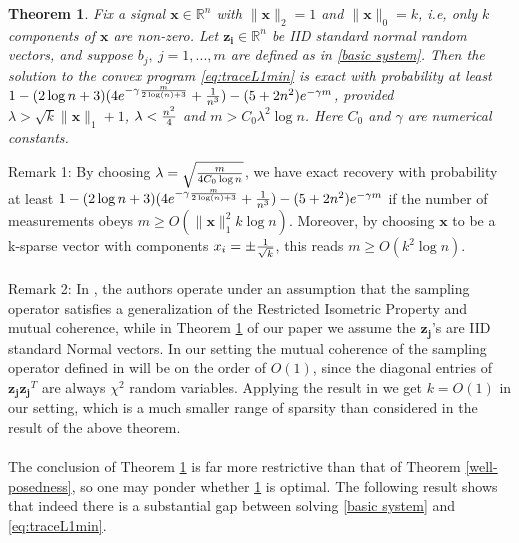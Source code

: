\documentclass[11pt]{article}
\newtheorem{theorem}{Theorem}[section]
\newcommand{\<}{\langle}
\renewcommand{\>}{\rangle}
\newcommand{\vct}[1]{\bm{#1}}
\numberwithin{equation}{section}
\begin{document}
\begin{theorem}
\label{thm1}
Fix a signal $\vct{x} \in \mathbb{R}^{n}$ with $\|\vct{x}\|_2 =1$ and $\|\vct{x}\|_0=k$, i.e, only $k$ components of $\vct{x}$ 
are non-zero. Let $\vct{z_i} \in \mathbb{R}^n$ be IID standard normal random vectors, and suppose $b_j, 
~j=1,...,m
$ are defined as in \eqref{basic system}.  Then the solution to the convex program \eqref{eq:traceL1min} is
exact with probability at least $1 - ( 2\log n+3 )(4e^{-\gamma \frac{m}{ 2\log(n) +3}}+{1\over{n^3}})-(5+2n^2)e^{-\gamma m}$, provided
$\lambda >\sqrt{k}\|\vct{x}\|_1+1$, $\lambda < {{n^2}\over{4}}$ and $m>C_0\lambda^2\log n$. Here $C_0$ and $
\gamma$ are numerical constants.
\end{theorem}
Remark 1: By choosing $\lambda=\sqrt{m\over{4C_0\log n}}$, we have exact recovery with probability at least $1 - (2\log n+3)(4e^{-\gamma \frac{m}{ 2\log(n) +3 }}+{1\over{n^3}})-(5+2n^2)e^{-\gamma m}$ if the number of measurements obeys 
$m 
\geq O(\|\vct{x}\|_1^2k\log n)$. Moreover, by choosing $\vct{x}$ to be a k-sparse vector with components $x_i=\pm
{1\over{\sqrt{k}}}$, this reads $m\geq O(k^2\log n)$. \\
\\
Remark 2: In \cite{CPR}, the authors operate under an assumption that the sampling operator satisfies a generalization of the Restricted 
Isometric Property and mutual coherence, while in Theorem \ref{thm1} of our paper we assume the $\vct{z_j}$'s 
are 
IID standard Normal vectors. In our setting the mutual coherence of the sampling operator defined in \cite{CPR} will be on the 
order of $O(1)$, since the diagonal entries of $\vct{z_j}\vct{z_j}^T$ are always $\chi^2$ random variables. 
Applying 
the result in \cite{CPR} we get $k=O(1)$ in our setting, which is a much smaller range of sparsity than considered in the result of the above theorem.\\
\\
The conclusion of Theorem \ref{thm1} is far more restrictive than that of Theorem \ref{well-posedness}, so one may ponder whether \ref{thm1} is optimal. The following result shows 
that indeed there is a substantial gap between solving  \eqref{basic system} and \eqref{eq:traceL1min}. 
\end{document}
